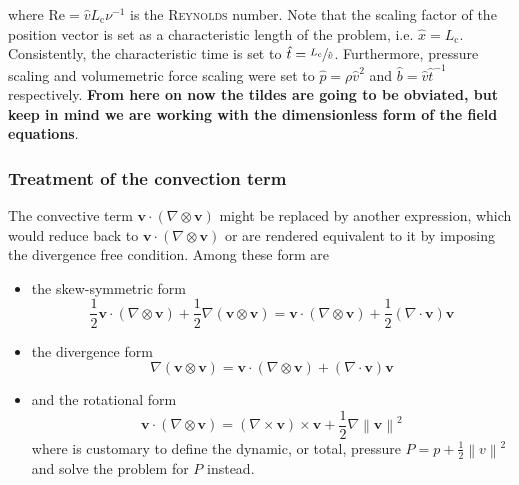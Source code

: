 \documentclass[]{scrartcl}
\newcommand{\bs}[1]{\boldsymbol{#1}}
\newcommand{\norm}[1]{\left\lVert #1 \right\rVert}
\begin{document}
where $\mathrm{Re} = \hat{v}L_\textrm{c}\nu^{-1}$ is the \textsc{Reynolds} number. Note that the scaling factor of the position vector is set as a characteristic length of the problem, i.e. $\hat{x} = L_\textrm{c}$. Consistently, the characteristic time is set to $\hat{t} = \sfrac{L_\textrm{c}}{\hat{v}}$. Furthermore, pressure scaling and volumemetric force scaling were set to $\hat{p} = \rho \hat{v}^2$ and $\hat{b} = \hat{v}\hat{t}^{-1}$ respectively. \textbf{From here on now the tildes are going to be obviated, but keep in mind we are working with the dimensionless form of the field equations}.\\

\subsubsection{Treatment of the convection term}
The convective term $\bs{v} \cdot (\nabla \otimes \bs{v})$ might be replaced by another expression, which would reduce back to  $\bs{v} \cdot (\nabla \otimes \bs{v})$ or are rendered equivalent to it  by imposing the divergence free condition. Among these form are
\begin{itemize}
	\item the skew-symmetric form
	\begin{equation}
		\label{Eqn:SkewSymmetricForm}
		\frac{1}{2}\bs{v} \cdot (\nabla \otimes \bs{v}) + \dfrac{1}{2} 	\nabla \left( \bs{v} \otimes \bs{v}\right) = \bs{v} \cdot (\nabla \otimes \bs{v}) + \dfrac{1}{2}(\nabla \cdot \bs{v})\bs{v}
	\end{equation}
	\item the divergence form
	\begin{equation}
		\label{Eqn:DivergenceForm}
		\nabla \left( \bs{v} \otimes \bs{v}\right) = \bs{v} \cdot (\nabla \otimes \bs{v}) + (\nabla \cdot \bs{v})\bs{v}
	\end{equation}
	\item and the rotational form
	\begin{equation}
		\label{Eqn:RotationalForm}
		\bs{v} \cdot (\nabla \otimes \bs{v}) = (\nabla \times \bs{v}) \times \bs{v} + \dfrac{1}{2} \nabla \norm{\bs{v}}^2
	\end{equation}
	where is customary to define the dynamic, or total, pressure $P = p +  \tfrac{1}{2} \norm{v}^2$ and solve the problem for $P$ instead.
\end{itemize}
\end{document}
